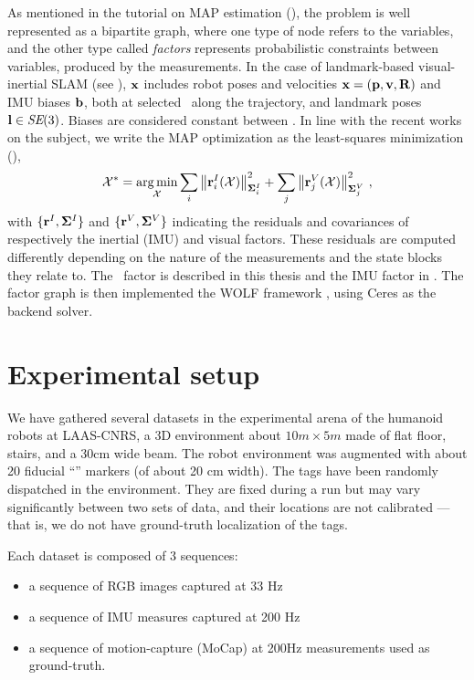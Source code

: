 As mentioned in the tutorial on MAP estimation (), the problem is well represented as a bipartite graph, where one type of node refers to the variables, 
and the other type called \emph{factors} represents probabilistic constraints between variables, produced by the measurements.
%
In the case of landmark-based visual-inertial SLAM (see ), ${\bf x}$ includes robot poses and velocities 
${\bf x}=({\bf p},{\bf v},{\bf R})$ and IMU biases ${\bf b}$, both at selected \keyframes\ along the trajectory, and landmark poses ${\bf l} \in \textit{SE}(3)$.
Biases are considered constant between \keyframes.
%
In line with the recent works on the subject, we write the MAP optimization as the least-squares minimization (),
%
\begin{align}\label{equ:least_squares}
    \mathcal{X}^* = \operatorname*{arg\,min}_{\mathcal{X}} 
    \sum_i {\left\|{\bf r}^I_i(\mathcal{X})\right\|}_{{\bm \Sigma}^I_i}^2
    +
    \sum_j {\left\|{\bf r}^V_j(\mathcal{X})\right\|}_{{\bm \Sigma}^V_j}^2
~,
\end{align}
%
with $\{{\bf r}^I,{\bm \Sigma}^I\}$ and $\{{\bf r}^V,{\bm \Sigma}^V\}$ indicating the residuals and covariances of respectively the inertial (IMU) and visual factors.
These residuals are computed differently depending on the nature of the measurements and the state blocks they relate to. 
The \apriltag\ factor is described in this thesis  and the IMU factor in .
The factor graph is then implemented the WOLF framework \cite{sola2021wolf}, using Ceres \cite{ceres-solver} as the backend solver. 



\section{Experimental setup}
We have gathered several datasets in the experimental arena of the humanoid robots at LAAS-CNRS, a 3D environment about $10m \times 5m$ made of flat floor, 
stairs, and a 30cm wide beam.
The robot environment was augmented with about 20 fiducial ``\apriltag'' markers (of about 20 cm width).
The tags have been randomly dispatched in the environment.
They are fixed during a run but may vary significantly between two sets of data, and their locations are not calibrated ---that is, we do not have ground-truth localization of the tags.

Each dataset is composed of 3 sequences:
\begin{itemize}
    \item a sequence of RGB images captured at 33 Hz
    \item a sequence of IMU measures captured at 200 Hz
    \item a sequence of motion-capture (MoCap) at 200Hz measurements used as ground-truth.
\end{itemize}


